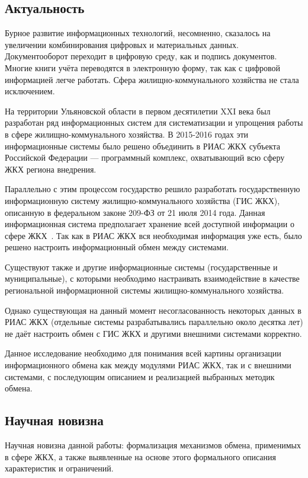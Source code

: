 \subsection*{Актуальность}

Бурное развитие информационных технологий, несомненно, сказалось на увеличении комбинирования цифровых и материальных данных.
Документооборот переходит в цифровую среду, как и подпись документов.
Многие книги учёта переводятся в электронную форму, так как с цифровой информацией легче работать.
Сфера жилищно-коммунального хозяйства не стала исключением.

На территории Ульяновской области в первом десятилетии XXI века был разработан ряд информационных систем для систематизации и упрощения работы в сфере жилищно-коммунального хозяйства.
В 2015-2016 годах эти информационные системы было решено объединить в РИАС ЖКХ субъекта Российской Федерации --- программный комплекс, охватывающий всю сферу ЖКХ региона внедрения.

Параллельно с этим процессом государство решило разработать государственную информационную систему жилищно-коммунального хозяйства (ГИС ЖКХ), описанную в федеральном законе 209-ФЗ от 21 июля 2014 года.
Данная информационная система предполагает хранение всей доступной информации о сфере ЖКХ~\cite{fz209}. Так как в РИАС ЖКХ вся необходимая информация уже есть, было решено настроить информационный обмен между системами.

Существуют также и другие информационные системы (государственные и муниципальные), с которыми необходимо настраивать взаимодействие в качестве региональной информационной системы жилищно-коммунального хозяйства.

Однако существующая на данный момент несогласованность некоторых данных в РИАС ЖКХ (отдельные системы разрабатывались параллельно около десятка лет) не даёт настроить обмен с ГИС ЖКХ и другими внешними системами корректно.

Данное исследование необходимо для понимания всей картины организации информационного обмена как между модулями РИАС ЖКХ, так и с внешними системами, с последующим описанием и реализацией выбранных методик обмена.

\subsection*{Научная новизна}

Научная новизна данной работы: формализация механизмов обмена, применимых в сфере ЖКХ, а также выявленные на основе этого формального описания характеристик и ограничений.

